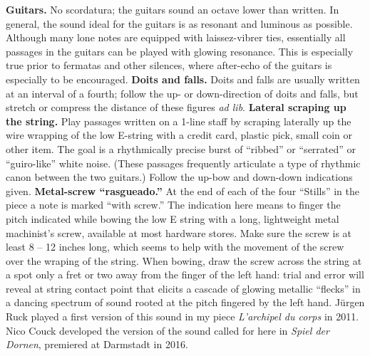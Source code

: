 \textbf{Guitars.} No scordatura; the guitars sound an octave lower than
written. In general, the sound ideal for the guitars is as resonant and
luminous as possible. Although many lone notes are equipped with laissez-vibrer
ties, essentially all passages in the guitars can be played with glowing
resonance. This is especially true prior to fermatas and other silences, where
after-echo of the guitars is especially to be encouraged. \textbf{Doits and
falls.} Doits and falls are usually written at an interval of a fourth; follow
the up- or down-direction of doits and falls, but stretch or compress the
distance of these figures \textit{ad lib}. \textbf{Lateral scraping up the
string.} Play passages written on a 1-line staff by scraping laterally up the
wire wrapping of the low E-string with a credit card, plastic pick, small coin
or other item. The goal is a rhythmically precise burst of ``ribbed'' or
``serrated'' or ``guiro-like'' white noise. (These passages frequently
articulate a type of rhythmic canon between the two guitars.) Follow the up-bow
and down-down indications given. \textbf{Metal-screw ``rasgueado.''} At the end
of each of the four ``Stills'' in the piece a note is marked ``with screw.''
The indication here means to finger the pitch indicated while bowing the low E
string with a long, lightweight metal machinist's screw, available at most
hardware stores. Make sure the screw is at least 8 -- 12 inches long, which
seems to help with the movement of the screw over the wraping of the string.
When bowing, draw the screw across the string at a spot only a fret or two away
from the finger of the left hand: trial and error will reveal at string contact
point that elicits a cascade of glowing metallic ``flecks'' in a dancing
spectrum of sound rooted at the pitch fingered by the left hand. Jürgen Ruck
played a first version of this sound in my piece \textit{L'archipel du corps}
in 2011. Nico Couck developed the version of the sound called for here in
\textit{Spiel der Dornen}, premiered at Darmstadt in 2016.

